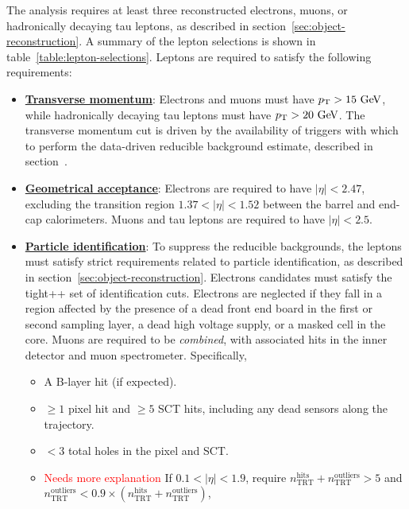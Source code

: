 The analysis requires at least three reconstructed electrons, muons, or hadronically decaying tau leptons, as described in section~\ref{sec:object-reconstruction}. A summary of the lepton selections is shown in table~\ref{table:lepton-selections}. Leptons are required to satisfy the following requirements:

\begin{itemize}

	\item \underline{\textbf{Transverse momentum}}: Electrons and muons must have $\pt>15 \GeV$, while hadronically decaying tau leptons must have $\pt>20 \GeV$. The transverse momentum cut is driven by the availability of triggers with which to perform the data-driven reducible background estimate, described in section~\label{sec:fake-factors}. 

	\item \underline{\textbf{Geometrical acceptance}}: Electrons are required to have $|\eta|<2.47$, excluding the transition region $1.37<|\eta|<1.52$ between the barrel and end-cap calorimeters. Muons and tau leptons are required to have $|\eta|<2.5$.

	\item \underline{\textbf{Particle identification}}: To suppress the reducible backgrounds, the leptons must satisfy strict requirements related to particle identification, as described in section~\ref{sec:object-reconstruction}. Electrons candidates must satisfy the tight++ set of identification cuts. Electrons are neglected if they fall in a region affected by the presence of a dead front end board in the first or second sampling layer, a dead high voltage supply, or a masked cell in the core. Muons are required to be \emph{combined}, with associated hits in the inner detector and muon spectrometer. Specifically, 
	\begin{itemize}
	  \item A B-layer hit (if expected).
	  \item $\geq1$ pixel hit and $\geq5$ SCT hits, including any dead sensors along the trajectory.
	  \item $<3$ total holes in the pixel and SCT. 
	  \item \textcolor{red}{Needs more explanation} If $0.1 < |\eta| < 1.9$, require $n_{\mathrm{TRT}}^{\mathrm{hits}}+n_{\mathrm{TRT}}^{\mathrm{outliers}} > 5$ and $n_{\mathrm{TRT}}^{\mathrm{outliers}} < 0.9 \times (n_{\mathrm{TRT}}^{\mathrm{hits}}+n_{\mathrm{TRT}}^{\mathrm{outliers}})$,
	\end{itemize}


\end{itemize}
